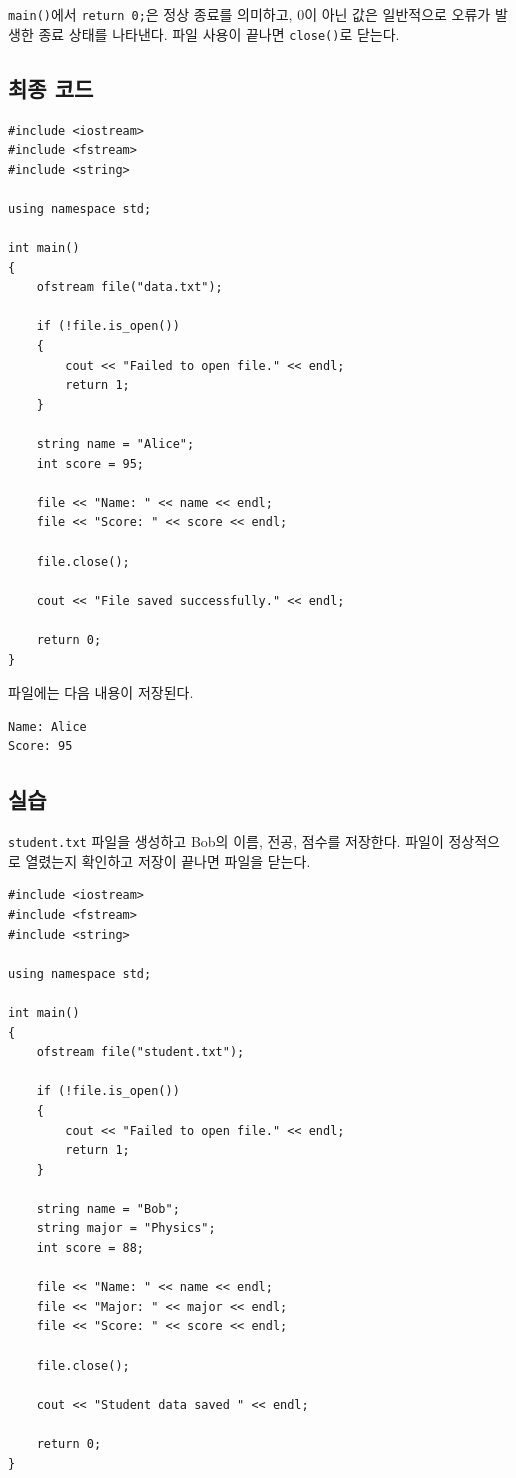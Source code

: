 \documentclass[11pt,a4paper]{article}
\begin{document}
\texttt{main()}에서 \texttt{return 0;}은 정상 종료를 의미하고,
0이 아닌 값은 일반적으로 오류가 발생한 종료 상태를 나타낸다.
파일 사용이 끝나면 \texttt{close()}로 닫는다.

\subsection{최종 코드}
\begin{lstlisting}
#include <iostream>
#include <fstream>
#include <string>

using namespace std;

int main()
{
    ofstream file("data.txt");

    if (!file.is_open())
    {
        cout << "Failed to open file." << endl;
        return 1;
    }

    string name = "Alice";
    int score = 95;

    file << "Name: " << name << endl;
    file << "Score: " << score << endl;

    file.close();

    cout << "File saved successfully." << endl;

    return 0;
}
\end{lstlisting}

파일에는 다음 내용이 저장된다.

\begin{verbatim}
Name: Alice
Score: 95
\end{verbatim}

\subsection{실습}
\begin{practicebox}
\texttt{student.txt} 파일을 생성하고 Bob의 이름, 전공, 점수를 저장한다.
파일이 정상적으로 열렸는지 확인하고 저장이 끝나면 파일을 닫는다.
\end{practicebox}

\begin{lstlisting}
#include <iostream>
#include <fstream>
#include <string>

using namespace std;

int main()
{
    ofstream file("student.txt");

    if (!file.is_open())
    {
        cout << "Failed to open file." << endl;
        return 1;
    }

    string name = "Bob";
    string major = "Physics";
    int score = 88;

    file << "Name: " << name << endl;
    file << "Major: " << major << endl;
    file << "Score: " << score << endl;

    file.close();

    cout << "Student data saved " << endl;

    return 0;
}
\end{lstlisting}
\end{document}
